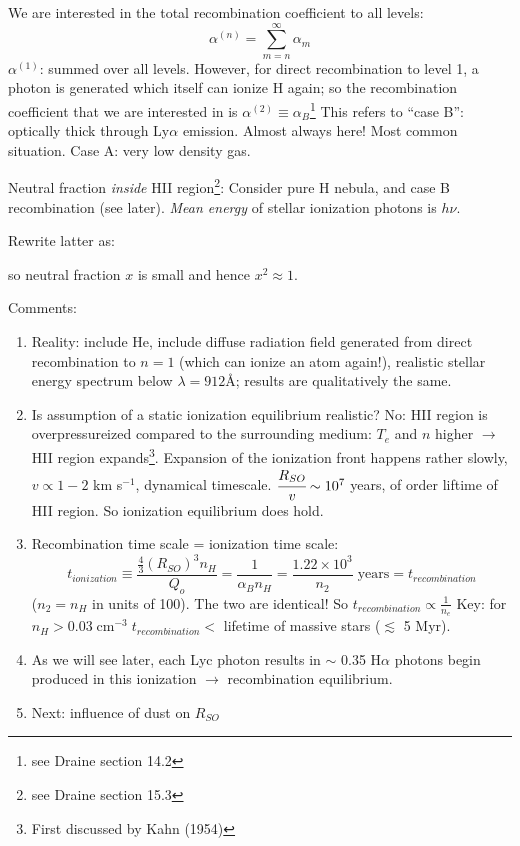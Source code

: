 \documentclass[12pt]{article}
\newcommand{\mar}[1]{\hspace{0pt}\marginpar{-\textcolor{black}{#1}-}}
\newcommand{\mynotes}[1]{\textcolor{mygreen}{#1}}
\begin{document}
We are interested in the total recombination coefficient to all levels:$${
    \alpha^{(n)} = \sum_{m=n}^{\infty}{\alpha_{m}}
}$$$\alpha^{(1)}$: summed over all levels. However, for direct recombination
to level 1, a photon is generated which itself can ionize H again; so the
recombination coefficient that we are interested in is
$\alpha^{(2)} \equiv \alpha_{B}$\footnote{see Draine section 14.2}
\mynotes{This refers to ``case B'': optically thick through Ly$\alpha$
emission. Almost always here! Most common situation. Case A: very low
density gas.}

\mar{56}Neutral fraction \emph{inside} HII region\footnote{see Draine
section 15.3}: Consider pure H nebula, and case B recombination (see
later). \emph{Mean energy} of stellar ionization photons is $h\nu$.

\mar{57}Rewrite latter as:$${
}$$

so neutral fraction $x$ is small and hence $x^{2} \approx 1$.

\mar{58}Comments:
\begin{enumerate}
    \item Reality: include He, include diffuse radiation field generated
        from direct recombination to $n=1$ (which can ionize an atom again!),
        realistic stellar energy spectrum below $\lambda = 912$\AA{};
        results are qualitatively the same.
    \item Is assumption of a static ionization equilibrium realistic? No: HII
        region is overpressureized compared to the surrounding medium: $T_{e}$ and
        $n$ higher $\longrightarrow$ HII region expands\footnote{First discussed
        by Kahn (1954)}. Expansion of the ionization front happens rather
        slowly, $v \propto 1-2$ km s$^{-1}$, dynamical timescale.
        $\cfrac{R_{SO}}{v} \sim 10^{7}$ years, of order liftime of HII region.
        So ionization equilibrium does hold.
    \item Recombination time scale = ionization time scale:$${
            t_{ionization} \equiv \frac{\frac{4}{3}(R_{SO})^{3}n_{H}}{Q_{o}} =
            \frac{1}{\alpha_{B}n_{H}} =
            \frac{1.22\times10^{3}}{n_{2}}\;\mathrm{years} =
            t_{recombination}
        }$$
        ($n_{2} = n_{H}$ in units of 100). The two are identical! So
        $t_{recombination} \propto \frac{1}{n_{e}}$
        Key: for $n_{H} > 0.03\;\mathrm{cm}^{-3}\;t_{recombination} <$
        lifetime of massive stars ($\lesssim$ 5 Myr).
    \item As we will see later, each Lyc photon results in $\sim$ 0.35
        H$\alpha$ photons begin produced in this ionization $\rightarrow$
        recombination equilibrium.
    \item Next: influence of dust on $R_{SO}$
\end{enumerate}
\end{document}
